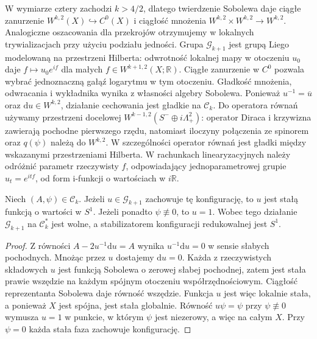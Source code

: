 W wymiarze cztery zachodzi $k>4/2$, dlatego
twierdzenie Sobolewa daje ciągłe zanurzenie
$W^{k,2}(X)\hookrightarrow C^0(X)$ i ciągłość
mnożenia $W^{k,2}\times W^{k,2}\to W^{k,2}$.
Analogiczne oszacowania dla przekrojów otrzymujemy
w lokalnych trywializacjach przy użyciu podziału jedności.
Grupa $\mathcal G_{k+1}$ jest grupą Liego
modelowaną na przestrzeni Hilberta:
odwrotność lokalnej mapy w otoczeniu $u_0$ daje
$f\mapsto u_0 e^{if}$ dla małych
$f\in W^{k+1,2}(X;\mathbb R)$.
Ciągłe zanurzenie w $C^0$ pozwala wybrać
jednoznaczną gałąź logarytmu w tym otoczeniu.
Gładkość mnożenia, odwracania i wykładnika wynika
z własności algebry Sobolewa.
Ponieważ $u^{-1}=\overline u$ oraz
$\mathrm du\in W^{k,2}$, działanie cechowania
jest gładkie na $\mathcal C_k$.
Do operatora równań używamy przestrzeni docelowej
$W^{k-1,2}(S^-\oplus i\Lambda^2_+)$:
operator Diraca i krzywizna zawierają pochodne
pierwszego rzędu, natomiast iloczyny połączenia
ze spinorem oraz $q(\psi)$ należą do $W^{k,2}$.
W szczególności operator równań jest gładki
między wskazanymi przestrzeniami Hilberta. W rachunkach
linearyzacyjnych należy odróżnić parametr rzeczywisty $f$,
odpowiadający jednoparametrowej grupie $u_t=e^{itf}$, od form
i-funkcji o wartościach w $i\mathbb R$.

\begin{stwierdzenie}
\label{prop:tg-sw-stabilizer}
Niech $(A,\psi)\in\mathcal C_k$. Jeżeli $u\in\mathcal G_{k+1}$
zachowuje tę konfigurację, to $u$ jest stałą funkcją o wartości
w $S^1$. Jeżeli ponadto $\psi\not\equiv0$, to $u=1$.
Wobec tego działanie $\mathcal G_{k+1}$ na $\mathcal C_k^*$
jest wolne, a stabilizatorem konfiguracji redukowalnej jest $S^1$.
\end{stwierdzenie}

\begin{proof}
Z równości $A-2u^{-1}\mathrm du=A$ wynika
$u^{-1}\mathrm du=0$ w sensie słabych pochodnych.
Mnożąc przez $u$ dostajemy $\mathrm du=0$.
Każda z rzeczywistych składowych $u$ jest
funkcją Sobolewa o zerowej słabej pochodnej,
zatem jest stała prawie wszędzie na każdym
spójnym otoczeniu współrzędnościowym.
Ciągłość reprezentanta Sobolewa daje równość
wszędzie. Funkcja $u$ jest więc lokalnie stała,
a ponieważ $X$ jest spójna, jest stała globalnie.
Równość $u\psi=\psi$ przy $\psi\not\equiv0$ wymusza
$u=1$ w punkcie, w którym $\psi$ jest niezerowy,
a więc na całym $X$. Przy $\psi=0$ każda stała faza
zachowuje konfigurację.
\end{proof}

